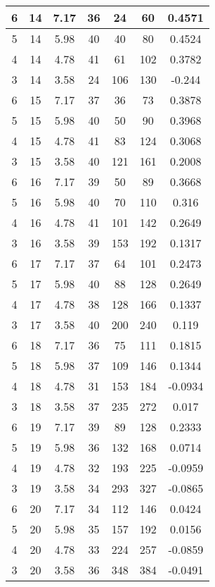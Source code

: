 \documentclass[letterpaper, 12pt]{article}
\begin{document}
\begin{longtable}{|c|c|c|c|c|c|c|}
\hline
6 & 14 & 7.17 & 36 & 24 & 60 & 0.4571 \\
\hline
5 & 14 & 5.98 & 40 & 40 & 80 & 0.4524 \\
\hline
4 & 14 & 4.78 & 41 & 61 & 102 & 0.3782 \\
\hline
3 & 14 & 3.58 & 24 & 106 & 130 & -0.244 \\
\hline
6 & 15 & 7.17 & 37 & 36 & 73 & 0.3878 \\
\hline
5 & 15 & 5.98 & 40 & 50 & 90 & 0.3968 \\
\hline
4 & 15 & 4.78 & 41 & 83 & 124 & 0.3068 \\
\hline
3 & 15 & 3.58 & 40 & 121 & 161 & 0.2008 \\
\hline
6 & 16 & 7.17 & 39 & 50 & 89 & 0.3668 \\
\hline
5 & 16 & 5.98 & 40 & 70 & 110 & 0.316 \\
\hline
4 & 16 & 4.78 & 41 & 101 & 142 & 0.2649 \\
\hline
3 & 16 & 3.58 & 39 & 153 & 192 & 0.1317 \\
\hline
6 & 17 & 7.17 & 37 & 64 & 101 & 0.2473 \\
\hline
5 & 17 & 5.98 & 40 & 88 & 128 & 0.2649 \\
\hline
4 & 17 & 4.78 & 38 & 128 & 166 & 0.1337 \\
\hline
3 & 17 & 3.58 & 40 & 200 & 240 & 0.119 \\
\hline
6 & 18 & 7.17 & 36 & 75 & 111 & 0.1815 \\
\hline
5 & 18 & 5.98 & 37 & 109 & 146 & 0.1344 \\
\hline
4 & 18 & 4.78 & 31 & 153 & 184 & -0.0934 \\
\hline
3 & 18 & 3.58 & 37 & 235 & 272 & 0.017 \\
\hline
6 & 19 & 7.17 & 39 & 89 & 128 & 0.2333 \\
\hline
5 & 19 & 5.98 & 36 & 132 & 168 & 0.0714 \\
\hline
4 & 19 & 4.78 & 32 & 193 & 225 & -0.0959 \\
\hline
3 & 19 & 3.58 & 34 & 293 & 327 & -0.0865 \\
\hline
6 & 20 & 7.17 & 34 & 112 & 146 & 0.0424 \\
\hline
5 & 20 & 5.98 & 35 & 157 & 192 & 0.0156 \\
\hline
4 & 20 & 4.78 & 33 & 224 & 257 & -0.0859 \\
\hline
3 & 20 & 3.58 & 36 & 348 & 384 & -0.0491 \\
\hline
\end{longtable}
\end{document}
